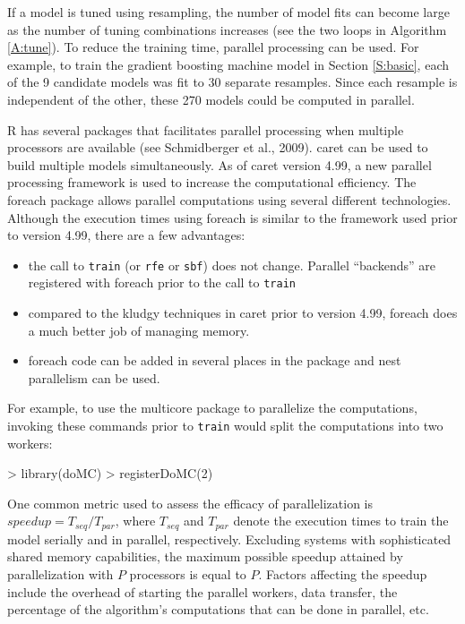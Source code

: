 \documentclass[12pt]{article}
\newcommand{\code}[1]{\mbox{\footnotesize\color{darkblue}\texttt{#1}}}
\newcommand{\pkg}[1]{{\fontseries{b}\selectfont #1}}
\renewcommand{\pkg}[1]{{\textsf{#1}}}
\renewenvironment{Schunk}{\vspace{\topsep}}{\vspace{\topsep}}
\begin{document}
If a model is tuned using resampling, the number of model fits can
become large as the number of tuning combinations increases (see the
two loops in Algorithm \ref{A:tune}). To reduce the training time,
parallel processing can be used.  
For example, to train the gradient boosting machine model in Section
\ref{S:basic}, each of the 9 candidate
models was fit to 30 separate
resamples. Since each resample is independent of the other, these
270  models
could be computed in parallel. 

R has several packages that facilitates parallel processing when
multiple processors are available (see Schmidberger et al., 2009). 
\pkg{caret} can be used to build multiple models simultaneously. 
As of \pkg{caret} version 4.99, a new parallel processing framework
is used to increase the computational efficiency. The \pkg{foreach}
package allows parallel computations using several different
technologies. Although the execution times using \pkg{foreach} is
similar to the framework used prior to version 4.99, there are a few advantages:
\begin{itemize}
  \item the call to \code{train} (or \code{rfe} or \code{sbf}) does
    not change. Parallel ``backends'' are registered with
    \pkg{foreach} prior to the call to \code{train}
  \item compared to the kludgy techniques in \pkg{caret} prior to
    version 4.99, \pkg{foreach} does a much better job of managing memory.
  \item \pkg{foreach} code can be added in several places in the
    package and nest parallelism can be used.
\end{itemize}


For example, to use the \pkg{multicore} package to parallelize the
computations, invoking these commands prior to \code{train} would
split the computations into two workers:
\begin{small}
\begin{Schunk}
\begin{Sinput}
> library(doMC)
> registerDoMC(2)
\end{Sinput}
\end{Schunk}
\end{small}

One common metric used to assess the efficacy of parallelization is
$speedup = T_{seq}/T_{par}$, where $T_{seq}$ and $T_{par}$ denote the
execution times to train the model serially and in parallel,
respectively. Excluding systems with sophisticated shared memory
capabilities, the maximum possible speedup attained by parallelization
with $P$ processors is equal to $P$. Factors affecting the speedup
include the overhead of starting the parallel workers, data transfer,
the percentage of the algorithm's computations that can be done in
parallel, etc.   
\end{document}
